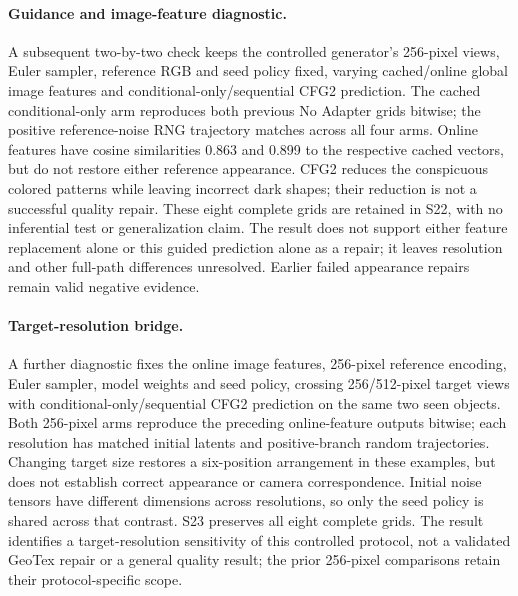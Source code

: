 \documentclass[times,twocolumn,final]{elsarticle}
\begin{document}
\paragraph{Guidance and image-feature diagnostic.}
A subsequent two-by-two check keeps the controlled generator's 256-pixel views, Euler sampler, reference RGB and seed policy fixed, varying cached/online global image features and conditional-only/sequential CFG2 prediction. The cached conditional-only arm reproduces both previous No Adapter grids bitwise; the positive reference-noise RNG trajectory matches across all four arms. Online features have cosine similarities 0.863 and 0.899 to the respective cached vectors, but do not restore either reference appearance. CFG2 reduces the conspicuous colored patterns while leaving incorrect dark shapes; their reduction is not a successful quality repair. These eight complete grids are retained in S22, with no inferential test or generalization claim. The result does not support either feature replacement alone or this guided prediction alone as a repair; it leaves resolution and other full-path differences unresolved. Earlier failed appearance repairs remain valid negative evidence.

\paragraph{Target-resolution bridge.}
A further diagnostic fixes the online image features, 256-pixel reference encoding, Euler sampler, model weights and seed policy, crossing 256/512-pixel target views with conditional-only/sequential CFG2 prediction on the same two seen objects. Both 256-pixel arms reproduce the preceding online-feature outputs bitwise; each resolution has matched initial latents and positive-branch random trajectories. Changing target size restores a six-position arrangement in these examples, but does not establish correct appearance or camera correspondence. Initial noise tensors have different dimensions across resolutions, so only the seed policy is shared across that contrast. S23 preserves all eight complete grids. The result identifies a target-resolution sensitivity of this controlled protocol, not a validated GeoTex repair or a general quality result; the prior 256-pixel comparisons retain their protocol-specific scope.
\end{document}
